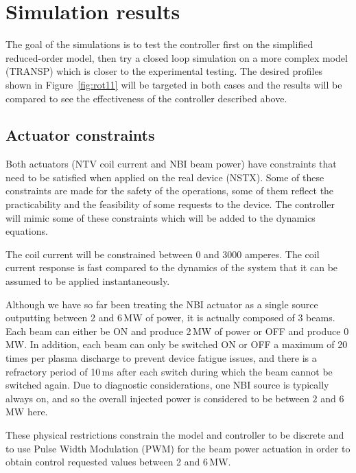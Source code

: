 \documentclass[12pt]{iopart}
\begin{document}
\clearpage


\section{Simulation results} 
The goal of the simulations is to test the controller first on the simplified reduced-order model, then try a closed loop simulation on a more complex model (TRANSP) which is closer to the experimental testing.  The desired profiles shown in Figure~\ref{fig:rot11} will be targeted in both cases and the results will be compared to see the effectiveness of the controller described above.

\subsection{Actuator constraints}
\label{constraints}

Both actuators (NTV coil current and NBI beam power) have constraints that need to be satisfied when applied on the real device (NSTX). Some of these constraints are made for the safety of the operations, some of them reflect the practicability and the feasibility of some requests to the device. The controller will mimic some of these constraints which will be added to the dynamics equations.

The coil current will be constrained between 0 and 3000 amperes.
The coil current response is fast compared to the dynamics of the system that it can be assumed to be applied instantaneously.

Although we have so far been treating the NBI actuator as a single source outputting between 2 and 6\,MW of power, it is actually composed of 3 beams. Each beam can either be ON and produce 2\,MW of power or OFF and produce 0\,MW.
In addition, each beam can only be switched ON or OFF a maximum of 20 times per plasma discharge to prevent device fatigue issues, and there is a refractory period of 10\,ms after each switch during which the beam cannot be switched again.
Due to diagnostic considerations, one NBI source is typically always on, and so the overall injected power is considered to be between $2$ and $6$ MW here.

These physical restrictions constrain the model and controller to be discrete and to use Pulse Width Modulation (PWM) for the beam power actuation in order to obtain control requested values between 2 and 6\,MW.

\end{document}
